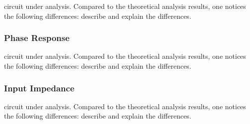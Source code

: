 circuit under analysis. Compared to the theoretical analysis results, one
notices the following differences: describe and explain the differences.


\lipsum[1-1]

\subsubsection{Phase Response}

circuit under analysis. Compared to the theoretical analysis results, one
notices the following differences: describe and explain the differences.


\lipsum[1-1]

\subsubsection{Input Impedance}

circuit under analysis. Compared to the theoretical analysis results, one
notices the following differences: describe and explain the differences.


\lipsum[1-1]




